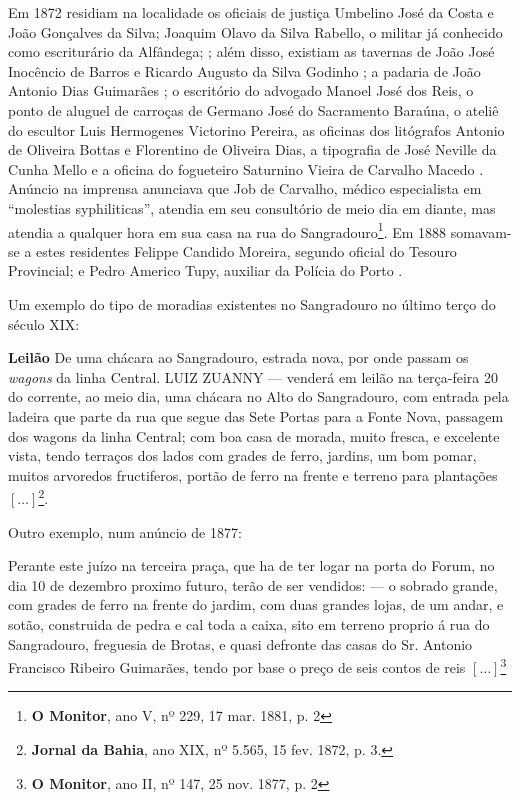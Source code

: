 Em 1872 residiam na localidade os oficiais de justiça Umbelino José da Costa e João Gonçalves da Silva; Joaquim Olavo da Silva Rabello, o militar já conhecido como escriturário da Alfândega; \cite[segunda~parte, pp.~60, 128, 167]{pimenta_almanak_1872}; além disso, existiam as tavernas de João José Inocêncio de Barros e Ricardo Augusto da Silva Godinho \cite[terceira parte, pp.~43, 49]{pimenta_almanak_1872}; a padaria de João Antonio Dias Guimarães \cite[terceira parte, p.~52]{pimenta_almanak_1872}; o escritório do advogado Manoel José dos Reis, o ponto de aluguel de carroças de Germano José do Sacramento Baraúna, o ateliê do escultor Luis Hermogenes Victorino Pereira, as oficinas dos litógrafos Antonio de Oliveira Bottas e Florentino de Oliveira Dias, a tipografia de José Neville da Cunha Mello e a oficina do fogueteiro Saturnino Vieira de Carvalho Macedo \cite[quarta parte, pp.~2, 20, 35, 36, 38 43]{pimenta_almanak_1872}. Anúncio na imprensa anunciava que Job de Carvalho, médico especialista em ``molestias syphiliticas'', atendia em seu consultório de meio dia em diante, mas atendia a qualquer hora em sua casa na rua do Sangradouro\footnote{\textbf{O Monitor}, ano V, nº 229, 17 mar. 1881, p. 2}. Em 1888 somavam-se a estes residentes Felippe Candido Moreira, segundo oficial do Tesouro Provincial; e Pedro Americo Tupy, auxiliar da Polícia do Porto \cite[pp.~18, 30]{carvalho_almanach_1888}. 

Um exemplo do tipo de moradias existentes no Sangradouro no último terço do século XIX:

\begin{citacao}
\textbf{Leilão}
De uma chácara ao Sangradouro, estrada nova, por onde passam os \textit{wagons} da linha Central.
LUIZ ZUANNY --- venderá em leilão na terça-feira 20 do corrente, ao meio dia, uma chácara no Alto do Sangradouro, com entrada pela ladeira que parte da rua que segue das Sete Portas para a Fonte Nova, passagem dos wagons da linha Central; com boa casa de morada, muito fresca, e excelente vista, tendo terraços dos lados com grades de ferro, jardins, um bom pomar, muitos arvoredos fructiferos, portão de ferro na frente e terreno para plantações \([\dots]\)\footnote{\textbf{Jornal da Bahia}, ano XIX, nº 5.565, 15 fev. 1872, p. 3.}.
\end{citacao}

Outro exemplo, num anúncio de 1877:

\begin{citacao}
Perante este juízo na terceira praça, que ha de ter logar na porta do Forum, no dia 10 de dezembro proximo futuro, terão de ser vendidos: --- o sobrado grande, com grades de ferro na frente do jardim, com duas grandes lojas, de um andar, e sotão, construida de pedra e cal toda a caixa, sito em terreno proprio á rua do Sangradouro, freguesia de Brotas, e quasi defronte das casas do Sr. Antonio Francisco Ribeiro Guimarães, tendo por base o preço de seis contos de reis \([\dots]\)\footnote{\textbf{O Monitor}, ano II, nº 147, 25 nov. 1877, p. 2}
\end{citacao}


